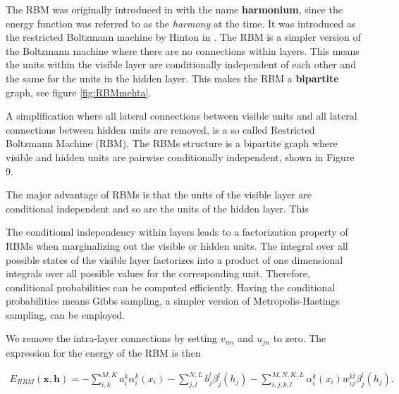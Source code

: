 The RBM was originally introduced in \cite{Smolensky1986} with the
name \textbf{harmonium}, since the energy function was referred to as
the \textit{harmony} at the time. It was introduced as the restricted
Boltzmann machine by Hinton in \cite{Hinton2002}.  The RBM is a
simpler version of the Boltzmann machine where there are no
connections within layers. This means the units within the visible
layer are conditionally independent of each other and the same for the
units in the hidden layer. This makes the RBM a \textbf{bipartite}
graph, see figure \ref{fig:RBMmehta}.

A simplification where all lateral connections between visible units
and all lateral connections between hidden units are removed, is a so
called Restricted Boltzmann Machine (RBM). The RBMs structure is a
bipartite graph where visible and hidden units are pairwise
conditionally independent, shown in Figure 9.

The major advantage of RBMs is that the units of the visible layer are
conditional independent and so are the units of the hidden layer. This

The conditional independency within layers leads to a factorization
property of RBMs when marginalizing out the visible or hidden
units. The integral over all possible states of the visible layer
factorizes into a product of one dimensional integrals over all
possible values for the corresponding unit. Therefore, conditional
probabilities can be computed efficiently. Having the conditional
probabilities means Gibbs sampling, a simpler version of
Metropolis-Hastings sampling, can be employed.



We remove the intra-layer connections by setting $v_{im}$ and $u_{jn}$ to zero. The expression for the energy of the RBM is then

\begin{align}
	E_{RBM}(\bm{x}, \bm{h}) = - \sum_{i, k}^{M, K} a_i^k \alpha_i^k (x_i)
	- \sum_{j, l}^{N, L} b_j^l \beta_j^l (h_j) 
	- \sum_{i,j,k,l}^{M,N,K,L} \alpha_i^k (x_i) w_{ij}^{kl} \beta_j^l (h_j). \label{eq:RBMenergy}
\end{align}


